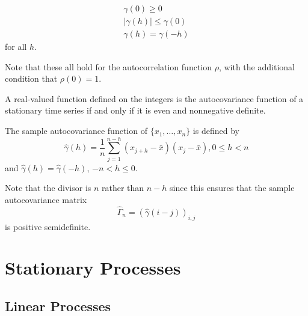 \begin{lem}
  \begin{align}
    \label{eq:13}
    \gamma(0) \geq 0 \\
    |\gamma(h)| \leq \gamma(0) \\
    \gamma(h) = \gamma(-h)
  \end{align} for all $h$.

  Note that these all hold for the autocorrelation function $\rho$,
  with the additional condition that $\rho(0) = 1$.
\end{lem}

\begin{thm}
  \label{defn:time_series:16}
  A real-valued function defined on the integers is the autocovariance
  function of a stationary time series if and only if it is even and
  nonnegative definite.
\end{thm}

\begin{defn}
  \label{defn:time_series:12}
  The sample autocovariance function of $\{ x_{1}, \dots, x_{n} \}$ is
  defined by
  \begin{equation}
    \label{eq:7}
    \hat \gamma(h) = \frac{1}{n} \sum_{j=1}^{n-h} (x_{j+h} - \bar
    x)(x_{j} - \bar x), 0 \leq h < n
  \end{equation} and $\hat \gamma(h) = \hat \gamma(-h)$, $-n < h \leq
  0$.

  Note that the divisor is $n$ rather than $n-h$ since this ensures
  that the sample autocovariance matrix
  \begin{equation}
    \label{eq:8}
    \hat \Gamma_{n} = (\hat \gamma(i - j))_{i, j}
  \end{equation} is positive semidefinite.
\end{defn}

\section{Stationary Processes}
\label{sec:stationary-processes-1}

\subsection{Linear Processes}
\label{sec:linear-processes}

